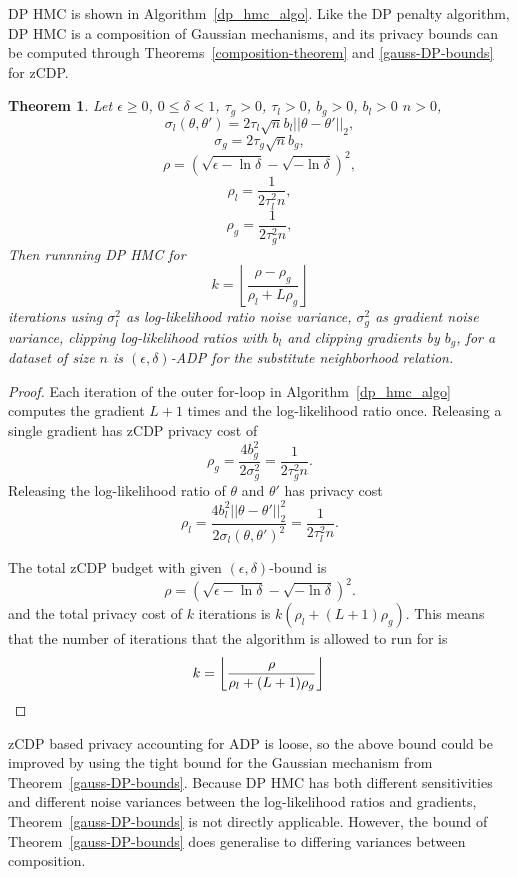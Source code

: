 \documentclass[english,twoside,openright]{HYgraduMLDS}
\newtheorem{theorem}[lemma]{Theorem}
\begin{document}
DP HMC is shown in Algorithm~\ref{dp_hmc_algo}.
Like the DP penalty algorithm, DP HMC is a composition of Gaussian mechanisms,
and its privacy bounds can be computed through Theorems~\ref{composition-theorem}
and \ref{gauss-DP-bounds} for zCDP.

\begin{theorem}\label{dp_hmc_theorem_zcdp}
  Let \(\epsilon \geq 0\), \(0 \leq \delta < 1\), \(\tau_{g} > 0\), \(\tau_{l} > 0\),
  \(b_{g} > 0\), \(b_{l} > 0\) \(n > 0\),
  \[\sigma_l(\theta, \theta') = 2\tau_l\sqrt{n}b_l||\theta - \theta'||_2,\]
  \[\sigma_g = 2\tau_g\sqrt{n}b_g,\]
  \[
    \rho = \left(\sqrt{\epsilon - \ln \delta} - \sqrt{-\ln \delta}\right)^2,
  \]
  \[
    \rho_l = \frac{1}{2\tau_l^2n},
  \]
  \[
    \rho_g = \frac{1}{2\tau_g^2n},
  \]
  Then runnning DP HMC for
  \[
    k = \left\lfloor\frac{\rho - \rho_{g}}{\rho_l + L\rho_g}\right\rfloor
  \]
  iterations using \(\sigma_{l}^{2}\) as log-likelihood ratio noise variance,
  \(\sigma_{g}^{2}\) as gradient noise variance, clipping log-likelihood ratios
  with \(b_{l}\) and clipping gradients by \(b_{g}\), for a dataset of size \(n\)
  is \((\epsilon, \delta)\)-ADP for the substitute neighborhood relation.
\end{theorem}
\begin{proof}
  Each iteration of the outer for-loop in Algorithm~\ref{dp_hmc_algo}
  computes the gradient \(L + 1\) times and
  the log-likelihood ratio once. Releasing a single gradient has zCDP privacy
  cost of
  \[
    \rho_g = \frac{4b_g^2}{2\sigma_g^2} = \frac{1}{2\tau_g^2n}.
  \]
  Releasing the log-likelihood ratio of \(\theta\) and \(\theta'\) has privacy cost
  \[
    \rho_l = \frac{4b_l^2||\theta - \theta'||_2^2}{2\sigma_l(\theta, \theta')^2} = \frac{1}{2\tau_l^2n}.
  \]

  The total zCDP budget with given \((\epsilon, \delta)\)-bound is
  \[
    \rho = \left(\sqrt{\epsilon - \ln \delta} - \sqrt{-\ln \delta}\right)^2.
  \]
  and the total privacy cost of \(k\) iterations is \(k(\rho_{l} + (L + 1)\rho_{g})\).
  This means that the number of iterations that the algorithm is allowed to run for
  is
  \[
    k = \left\lfloor\frac{\rho}{\rho_l + (L + 1)\rho_g}\right\rfloor
    \qedhere
  \]
\end{proof}

zCDP based privacy accounting for ADP is loose, so the above bound could be improved
by using the tight bound for the Gaussian mechanism from
Theorem~\ref{gauss-DP-bounds}. Because DP HMC has both
different sensitivities and different noise variances between the log-likelihood
ratios and gradients, Theorem~\ref{gauss-DP-bounds} is not directly applicable.
However, the bound of Theorem~\ref{gauss-DP-bounds} does generalise to differing
variances between composition.
\end{document}
